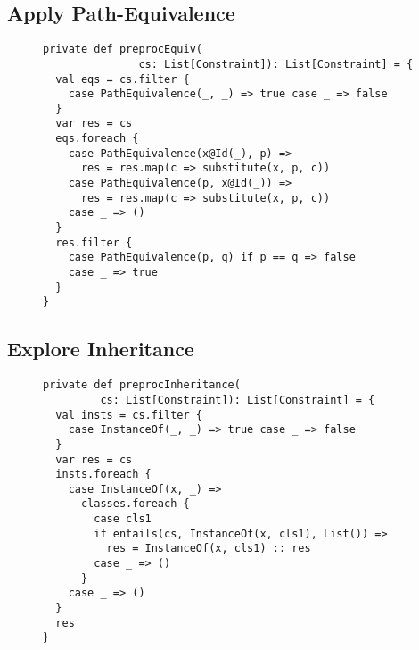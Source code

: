 \subsection{Apply Path-Equivalence}
\begin{figure}[h]
\begin{lstlisting}
private def preprocEquiv(
               cs: List[Constraint]): List[Constraint] = {
  val eqs = cs.filter {
    case PathEquivalence(_, _) => true case _ => false
  }
  var res = cs
  eqs.foreach {
    case PathEquivalence(x@Id(_), p) =>
      res = res.map(c => substitute(x, p, c))
    case PathEquivalence(p, x@Id(_)) =>
      res = res.map(c => substitute(x, p, c))
    case _ => ()
  }
  res.filter {
    case PathEquivalence(p, q) if p == q => false
    case _ => true
  }
}
\end{lstlisting}
\end{figure}

\subsection{Explore Inheritance}

\begin{figure}[h]
\begin{lstlisting}
private def preprocInheritance(
         cs: List[Constraint]): List[Constraint] = {
  val insts = cs.filter {
    case InstanceOf(_, _) => true case _ => false
  }
  var res = cs
  insts.foreach {
    case InstanceOf(x, _) =>
      classes.foreach {
        case cls1
        if entails(cs, InstanceOf(x, cls1), List()) =>
          res = InstanceOf(x, cls1) :: res
        case _ => ()
      }
    case _ => ()
  }
  res
}
\end{lstlisting}
\end{figure}

